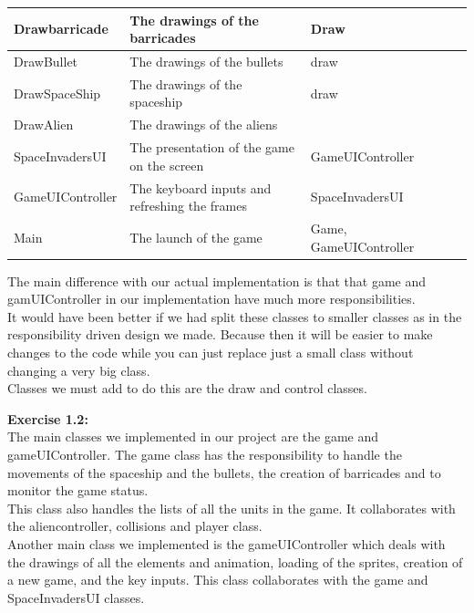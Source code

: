 \documentclass[10pt]{article}
\begin{document}
\begin{center}
\begin{tabular}{ | p{3cm} | p{5cm} | p{3cm} | p{2cm} | p{2cm} |}
  Drawbarricade & The drawings of the barricades & Draw & &  \\  \hline
  DrawBullet & The drawings of the bullets & draw & &  \\  \hline
  DrawSpaceShip & The drawings of the spaceship & draw & &  \\  \hline
  DrawAlien  & The drawings of the aliens & & &  \\  \hline
  SpaceInvadersUI & The presentation of the game on the screen & GameUIController & &  \\  \hline
  GameUIController & The keyboard inputs and refreshing the frames & SpaceInvadersUI & &  \\  \hline
  Main & The launch of the game & Game, GameUIController & &  \\  \hline
    \end{tabular}
\end{center}

The main difference with our actual implementation is that that game and gamUIController in our implementation have much more responsibilities.\\
It would have been better if we had split these classes to smaller classes as in the responsibility driven design we made. Because then it will be easier to make changes to the code while you can just replace just a small class without changing a very big class. \\
Classes we must add to do this are the draw and control classes. 

 \pagebreak

 \textbf{Exercise 1.2:}\\
The main classes we implemented in our project are the game and gameUIController.
The game class has the responsibility to handle the movements of the spaceship and the bullets, the creation of barricades and to monitor the game status.\\
 This class also handles the lists of all the units in the game. It collaborates with the aliencontroller, collisions and player class. \\
Another main class we implemented is the gameUIController which deals with the drawings of all the elements and animation, loading of the sprites, creation of a new game,  and the key inputs.
 This class collaborates with the game and SpaceInvadersUI classes.\\
\end{document}
